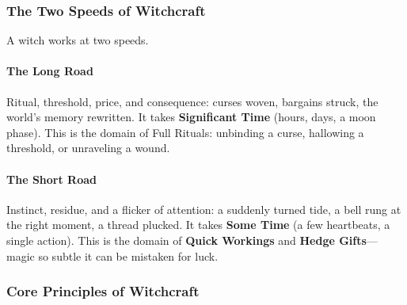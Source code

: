 \subsubsection{The Two Speeds of Witchcraft}

A witch works at two speeds.

\paragraph{The Long Road}
Ritual, threshold, price, and consequence: curses woven, bargains struck, the world's memory rewritten. It takes \textbf{Significant Time} (hours, days, a moon phase). This is the domain of Full Rituals: unbinding a curse, hallowing a threshold, or unraveling a wound.

\paragraph{The Short Road}
Instinct, residue, and a flicker of attention: a suddenly turned tide, a bell rung at the right moment, a thread plucked. It takes \textbf{Some Time} (a few heartbeats, a single action). This is the domain of \textbf{Quick Workings} and \textbf{Hedge Gifts}---magic so subtle it can be mistaken for luck.

\subsubsection{Core Principles of Witchcraft}

